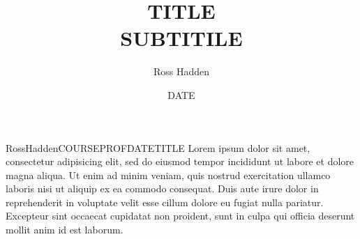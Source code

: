 \documentclass[12pt,letterpaper]{article}
\begin{document}
	\title{
		TITLE \\
		\small{SUBTITILE}
	}
	\date{DATE}
	\author{Ross Hadden}
	\maketitle

	\pagebreak

	\begin{mla}{Ross}{Hadden}{COURSE}{PROF}{DATE}{TITLE}
		Lorem ipsum dolor sit amet, consectetur adipisicing elit, sed do eiusmod tempor incididunt ut labore et dolore magna aliqua. Ut enim ad minim veniam, quis nostrud exercitation ullamco laboris nisi ut aliquip ex ea commodo consequat. Duis aute irure dolor in reprehenderit in voluptate velit esse cillum dolore eu fugiat nulla pariatur. Excepteur sint occaecat cupidatat non proident, sunt in culpa qui officia deserunt mollit anim id est laborum.
	\end{mla}
\end{document}
